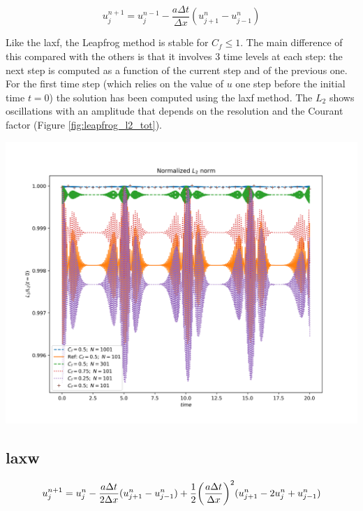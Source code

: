 \documentclass[11pt, a4paper]{article}
\begin{document}
\begin{equation} \label{eq:leapfrog}
    u^{n+1}_j = u^{n-1}_j - \frac{a \Delta t}{\Delta x} (u^n_{j+1} - u^n_{j-1})
\end{equation}

Like the \acrshort{laxf}, the Leapfrog method is stable for \(C_f \leq 1\). The main difference of this compared with the others is that it involves 3 time levels at each step: the next step is computed as a function of the current step and of the previous one. For the first time step (which relies on the value of \(u\) one step before the initial time \(t = 0\)) the solution has been computed using the \acrshort{laxf} method. The \(L_2\) shows oscillations with an amplitude that depends on the resolution and the Courant factor (Figure \ref{fig:leapfrog_l2_tot}).

\begin{center}
    \centering
    \includegraphics[width=0.9\linewidth]{images/L2_GAUS_LEAPFROG.png}
    \label{fig:leapfrog_l2_tot}
\end{center}

\subsection{\acrfull{laxw}}

\begin{equation} \label{eq:lax-w}
    u^{n+1}_j = u^n_j - \frac{a \Delta t}{2 \Delta x} (u^n_{j+1} - u^n_{j-1}) + \frac{1}{2}\qty(\frac{a \Delta t}{\Delta x})^2 (u^n_{j+1} - 2u^n_j + u^n_{j-1})
\end{equation}
\end{document}
